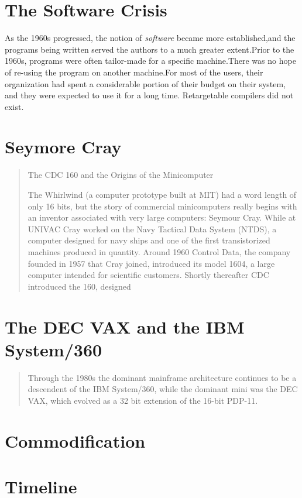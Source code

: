 \section{The Software Crisis}
As the 1960s progressed, 
the notion of 
\textit{software} became more established,and the programs being written served the authors to a 
much greater extent.Prior to the 1960s, programs were often tailor-made for a specific 
machine.There was no hope of re-using the program on another machine.For most of the users, their 
organization had spent a considerable portion of their budget on their system, and they were 
expected to use it for a long time. Retargetable compilers did not exist.



\section{Seymore Cray}
\begin{quotation}
    The CDC 160 and the Origins of the Minicomputer
    
    The Whirlwind (a computer prototype built at 
MIT) had a word length of only 16 bits, but the story of commercial minicomputers really begins with 
an inventor associated with very large computers: Seymour Cray. While at UNIVAC Cray worked on the 
Navy Tactical Data System (NTDS), a computer designed for navy ships and one of the first 
transistorized machines produced in quantity. Around 1960 Control Data, the company founded in 1957 
that Cray joined, introduced its model 1604, a large computer intended for scientific customers. 
Shortly thereafter CDC introduced the 160, designed
\cite{nothing_new_since_von_neumann_2000}
\end{quotation}

\section{The DEC VAX and the IBM System/360}
\begin{quotation}
    Through the 1980s the dominant mainframe architecture continues to be a descendent of the IBM 
System/360, while the dominant mini was the DEC VAX, which evolved as a 32 bit extension of the 
16-bit PDP-11.
\cite{nothing_new_since_von_neumann_2000}
\end{quotation}
\section{Commodification}
\pagebreak
\section{Timeline}

